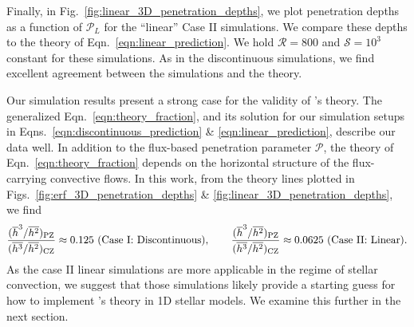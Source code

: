 \documentclass{aastex631}
\newcommand{\mP}{\ensuremath{\mathcal{P}}}
\newcommand{\mR}{\ensuremath{\mathcal{R}}}
\newcommand{\mS}{\ensuremath{\mathcal{S}}}
\begin{document}
Finally, in Fig.~\ref{fig:linear_3D_penetration_depths}, we plot penetration depths as a function of $\mP_L$ for the ``linear'' Case II simulations.
We compare these depths to the theory of Eqn.~\ref{eqn:linear_prediction}.
We hold $\mR = 800$ and $\mS = 10^3$ constant for these simulations.
As in the discontinuous simulations, we find excellent agreement between the simulations and the theory.

Our simulation results present a strong case for the validity of \citet{zahn1991}'s theory.
The generalized Eqn.~\ref{eqn:theory_fraction}, and its solution for our simulation setups in Eqns.~\ref{eqn:discontinuous_prediction} \& \ref{eqn:linear_prediction}, describe our data well.
In addition to the flux-based penetration parameter $\mP$, the theory of Eqn.~\ref{eqn:theory_fraction} depends on the horizontal structure of the flux-carrying convective flows.
In this work, from the theory lines plotted in Figs.~\ref{fig:erf_3D_penetration_depths} \& \ref{fig:linear_3D_penetration_depths}, we find
\begin{equation}
\frac{(\overline{h}^3/\overline{h^2})_{\rm{PZ}}}{(\overline{h^3}/\overline{h^2})_{\rm{CZ}}} \approx 0.125 \,\,(\text{Case I: Discontinuous}),\qquad
\frac{(\overline{h}^3/\overline{h^2})_{\rm{PZ}}}{(\overline{h^3}/\overline{h^2})_{\rm{CZ}}} \approx 0.0625 \,\,(\text{Case II: Linear}).
\label{eqn:fit_h_values}
\end{equation}
As the case II linear simulations are more applicable in the regime of stellar convection, we suggest that those simulations likely provide a starting guess for how to implement \citet{zahn1991}'s theory in 1D stellar models.
We examine this further in the next section.
\end{document}
